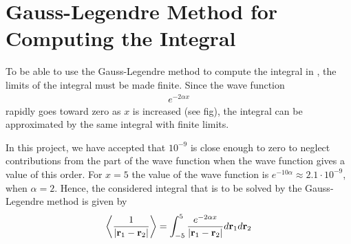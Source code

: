 \section{Gauss-Legendre Method for Computing the Integral}

To be able to use the Gauss-Legendre method to compute the integral in , the limits of the integral must be made  finite.
Since the wave function 
\begin{align}
	e^{-2\alpha x}
\end{align}
rapidly goes toward zero as $x$ is increased (see fig), the integral can be approximated  by the same integral with finite limits.

In this project, we  have accepted that $10^{-9}$ is close enough to zero to neglect contributions from the part of the wave function when the wave function gives a value of this order.
For $x=5$ the value of the wave function is $e^{-10\alpha} \approx 2.1\cdot 10^{-9}$, when $\alpha = 2$.
Hence, the considered integral that is to be solved by the Gauss-Legendre method is given by
\begin{align}
   \left< \frac{1}{| \mbox{\textbf{r}}_1 - \mbox{\textbf{r}}_2 |} \right> 
   = \int _{-5} ^{5} \frac{e^{-2\alpha x}}{| \mbox{\textbf{r}}_1 - \mbox{\textbf{r}}_2 |} d \mbox{\textbf{r}}_1 d\mbox{\textbf{r}}_2
\label{eq:GLdMethod1}
\end{align} 